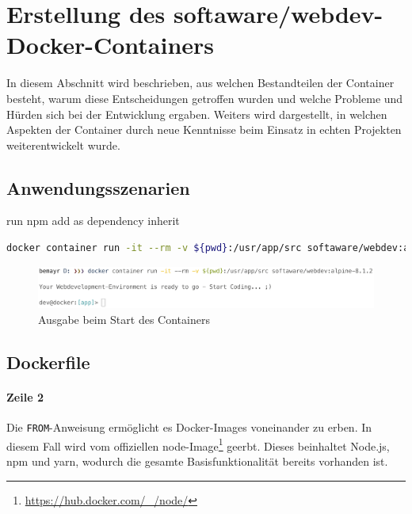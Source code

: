 \chapter{Erstellung des softaware/webdev-Docker-Containers}
\label{cha:implementation}
In diesem Abschnitt wird beschrieben, aus welchen Bestandteilen der Container besteht, warum diese Entscheidungen getroffen wurden und welche Probleme und Hürden sich bei der Entwicklung ergaben.
Weiters wird dargestellt, in welchen Aspekten der Container durch neue Kenntnisse beim Einsatz in echten Projekten weiterentwickelt wurde.

\section{Anwendungsszenarien}

run npm
add as dependency
inherit

\begin{lstlisting}[caption=Kommando zum Starten des softaware/webdev-Containers, language=bash, label=lst:docker-run-webdev]
docker container run -it --rm -v ${pwd}:/usr/app/src softaware/webdev:alpine-8.1.2
\end{lstlisting}

\begin{figure}[htbp]
    \centering
    \includegraphics[width=0.95\linewidth,clip]{images/container-execution}
    \caption{Ausgabe beim Start des Containers}
\label{fig:container-execution}
\end{figure}

\section{Dockerfile}
\label{sec:dockerfile}


\subsubsection{Zeile 2}
Die \verb|FROM|-Anweisung ermöglicht es Docker-Images voneinander zu erben.
In diesem Fall wird vom offiziellen node-Image\footnote{\url{https://hub.docker.com/_/node/}} geerbt.
Dieses beinhaltet Node.js, npm und yarn, wodurch die gesamte Basisfunktionalität bereits vorhanden ist.

